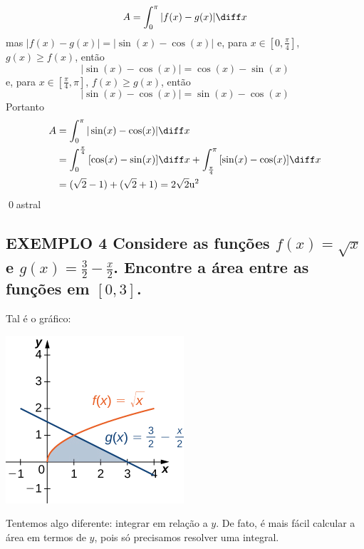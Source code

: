 \documentclass[a4paper, 12pt]{extreport}
\begin{document}
      \begin{equation*}
        A = \int_0^\pi{|f(x) - g(x)|}\diff x
      \end{equation*}
      mas $|f(x) - g(x)| = |\sin(x) - \cos(x)|$ e, para $x\in[0, \frac{\pi}{4}]$, $g(x) \geqslant f(x)$, então
      \begin{equation*}
        |\sin(x) - \cos(x)| = \cos(x) - \sin(x)
      \end{equation*}
      e, para $x\in[\frac{\pi}{4}, \pi]$, $f(x) \geqslant g(x)$, então
      \begin{equation*}
        |\sin(x) - \cos(x)| = \sin(x) - \cos(x)
      \end{equation*}
      Portanto
      \begin{equation*}
        \begin{split}
          A & = \int_0^\pi{|\sin(x) - \cos(x)|\diff x} \\
            & = \int_0^\frac{\pi}{4}{[\cos(x) - \sin(x)]\diff x} + \int_{\frac{\pi}{4}}^\pi{[\sin(x) - \cos(x)]\diff x} \\
            & = (\sqrt{2} - 1) + (\sqrt{2} + 1) = 2\sqrt{2}\mathrm{u^2}
        \end{split}
      \end{equation*}
      \qed{astral}

    \subsection*{\small {\color{astral}EXEMPLO 4} \textmd{
      Considere as funções $f(x) = \sqrt{x}$ e $g(x) = \frac{3}{2}-\frac{x}{2}$. Encontre a área entre as funções em $[0, 3]$.
    }}
    \noindent
      Tal é o gráfico:
      \begin{center}
        \includegraphics{eg4}
      \end{center}
      Tentemos algo diferente: integrar em relação a $y$. De fato, é mais fácil calcular a área em termos de $y$, pois só precisamos
      resolver uma integral.
\end{document}

